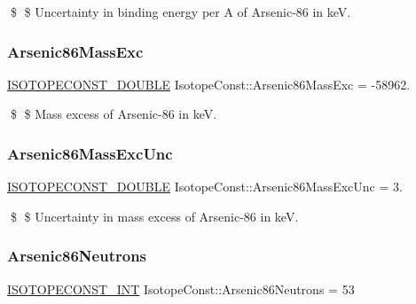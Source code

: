 \$ \$ Uncertainty in binding energy per A of Arsenic-\/86 in keV. \mbox{\label{group___isotope_const-_arsenic-_as86_gaa8f02ab304713145f913e9a8b10a933b}} 
\subsubsection{\texorpdfstring{Arsenic86\+Mass\+Exc}{Arsenic86MassExc}}
{\footnotesize\ttfamily \mbox{\hyperlink{group___isotope_const-_macros_ga8f45a7272ce02c0b4c65c44636ed719a}{I\+S\+O\+T\+O\+P\+E\+C\+O\+N\+S\+T\+\_\+\+D\+O\+U\+B\+LE}} Isotope\+Const\+::\+Arsenic86\+Mass\+Exc = -\/58962.}

\$ \$ Mass excess of Arsenic-\/86 in keV. \mbox{\label{group___isotope_const-_arsenic-_as86_ga8e15840999bdfb57d2323812dfcb002f}} 
\subsubsection{\texorpdfstring{Arsenic86\+Mass\+Exc\+Unc}{Arsenic86MassExcUnc}}
{\footnotesize\ttfamily \mbox{\hyperlink{group___isotope_const-_macros_ga8f45a7272ce02c0b4c65c44636ed719a}{I\+S\+O\+T\+O\+P\+E\+C\+O\+N\+S\+T\+\_\+\+D\+O\+U\+B\+LE}} Isotope\+Const\+::\+Arsenic86\+Mass\+Exc\+Unc = 3.}

\$ \$ Uncertainty in mass excess of Arsenic-\/86 in keV. \mbox{\label{group___isotope_const-_arsenic-_as86_gad6d1ac86a5fe3073d5f1ae64c6dd7dc9}} 
\subsubsection{\texorpdfstring{Arsenic86\+Neutrons}{Arsenic86Neutrons}}
{\footnotesize\ttfamily \mbox{\hyperlink{group___isotope_const-_macros_ga5f18360b3e99483a35c32d789e62621c}{I\+S\+O\+T\+O\+P\+E\+C\+O\+N\+S\+T\+\_\+\+I\+NT}} Isotope\+Const\+::\+Arsenic86\+Neutrons = 53}

